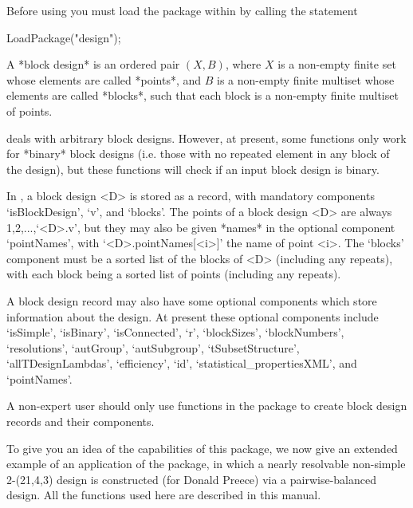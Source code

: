 
Before using {\DESIGN} you must load the package within {\GAP} by calling 
the statement

\begintt
LoadPackage("design");
\endtt


A *block design*
is an ordered pair $(X,B)$, where
$X$ is a non-empty finite set whose elements are called *points*, and
$B$ is a non-empty finite multiset whose elements are called *blocks*,
such that each block is a non-empty finite multiset of points.

{\DESIGN} deals with arbitrary block designs. However, at present, some
{\DESIGN} functions only work for *binary* block designs
(i.e. those with no repeated element in any block of
the design), but these functions will check if an input block design
is binary.

In {\DESIGN}, a block design <D> is stored as a record, with mandatory
components `isBlockDesign', `v', and `blocks'.  The points of a block
design <D> are always 1,2,...,`<D>.v', but they may also be given *names*
in the optional component `pointNames', with `<D>.pointNames[<i>]'
the name of point <i>.  The `blocks' component must be a sorted list
of the blocks of <D> (including any repeats), with each block being a
sorted list of points (including any repeats). 

A block design record may also have some optional components which store
information about the design. At present these optional components include
`isSimple', `isBinary', `isConnected', `r', `blockSizes', `blockNumbers',
`resolutions', `autGroup', `autSubgroup', `tSubsetStructure',
`allTDesignLambdas', `efficiency', `id', `statistical_propertiesXML',
and `pointNames'.

A non-expert user should only use functions in the {\DESIGN} package to
create block design records and their components.


To give you an idea of the capabilities of this package, we now give
an extended example of an application of the {\DESIGN} package, in
which a nearly resolvable non-simple 2-(21,4,3) design is constructed
(for Donald Preece) via a pairwise-balanced design. All the {\DESIGN}
functions used here are described in this manual.

